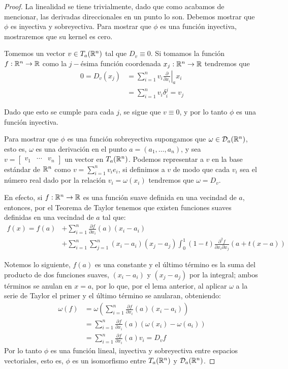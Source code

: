 \begin{proof}
	La linealidad se tiene trivialmente, dado que como acabamos de mencionar, las derivadas direccionales en un punto lo son. Debemos mostrar que $\phi$ es inyectiva y sobreyectiva. Para mostrar que $\phi$ es una función inyectiva, mostraremos que su kernel es cero.

	Tomemos un vector $v \in T_a(\mathbb{R}^n)$ tal que $D_v \equiv 0$. Si tomamos la función $f: \mathbb{R}^n \to \mathbb{R}$ como la $j-$ésima función coordenada $x_j: \mathbb{R}^n \to \mathbb{R}$ tendremos que
	\begin{align*}
		0 = D_v(x_j) & = \left. \sum_{i=1}^{n} v_i \frac{\partial}{\partial x_i} \right|_{a} x_i \\
		             & = \sum_{i=1}^{n} v_i \delta_i^j = v_j
	\end{align*}

	Dado que esto se cumple para cada $j$, se sigue que $v \equiv 0$, y por lo tanto $\phi$ es una función inyectiva.

	Para mostrar que $\phi$ es una función sobreyectiva supongamos que $\omega \in \mathcal{D}_a(\mathbb{R}^n)$, esto es, $\omega$ es una derivación en el punto $a = (a_1, \dots, a_n)$, y sea $v = \begin{bmatrix} v_1 & \cdots & v_n \end{bmatrix}$ un vector en $T_a(\mathbb{R}^n)$. Podemos representar a $v$ en la base estándar de $\mathbb{R}^n$ como $v = \sum_{i=1}^{n} v_i e_i$, si definimos a $v$ de modo que cada $v_i$ sea el número real dado por la relación $v_i = \omega(x_i)$ tendremos que $\omega = D_v$.

	En efecto, si $f: \mathbb{R}^n \to \mathbb{R}$ es una función suave definida en una vecindad de $a$, entonces, por el Teorema de Taylor tenemos que existen funciones suaves definidas en una vecindad de $a$ tal que:
  \begin{align*}
    f(x) = f(a) 
    &+ \sum_{i=1}^{n} \frac{\partial f}{\partial x_i} (a) (x_i - a_i) \\
    &+ \sum_{i=1}^{n} \sum_{j=1}^{n} (x_i - a_i)(x_j - a_j) \int_{0}^{1} (1-t) \frac{\partial^2 f}{\partial x_i \partial x_j} (a + t(x - a))
  \end{align*}

	Notemos lo siguiente, $f(a)$ es una constante y el último término es la suma del producto de dos funciones suaves, $(x_i - a_i)$ y $(x_j - a_j)$ por la integral; ambos términos se anulan en $x = a$, por lo que, por el lema anterior, al aplicar $\omega$ a la serie de Taylor el primer y el último término se anularan, obteniendo:
	\begin{align*}
		\omega(f) & = \omega(\sum_{i=1}^{n} \frac{\partial f}{\partial x_i} (a )(x_i - a_i))        \\
		          & = \sum_{i=1}^{n} \frac{\partial f}{\partial x_i} (a)(\omega(x_i) - \omega(a_i)) \\
		          & = \sum_{i=1}^{n} \frac{\partial f}{\partial x_i}(a) v_i = D_v f
	\end{align*}
	Por lo tanto $\phi$ es una función lineal, inyectiva y sobreyectiva entre espacios vectoriales, esto es, $\phi$ es un isomorfismo entre $T_a(\mathbb{R}^n)$ y $\mathcal{D}_a(\mathbb{R}^n)$.
\end{proof}


